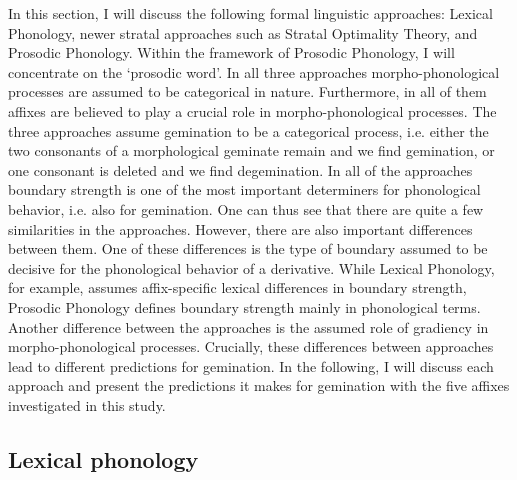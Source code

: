 In this section, I will discuss the following formal linguistic approaches: Lexical Phonology, newer stratal approaches such as Stratal Optimality Theory, and Prosodic Phonology. Within the framework of Prosodic Phonology, I will concentrate on the `prosodic word'.  In all three approaches morpho-phonological processes are assumed to be categorical in nature. Furthermore, in all of them affixes are believed to play a crucial role in morpho-phonological processes. The three approaches assume gemination to be a categorical process, i.e. either the two consonants of a morphological geminate remain and we find gemination, or one consonant is deleted and we find degemination. In all of the approaches boundary strength is one of the most important determiners for phonological behavior, i.e. also for gemination. 
One can thus see that there are quite a few similarities in the approaches. However, there are also important differences between them. One of these differences is the type of boundary assumed to be decisive for the phonological behavior of a derivative. While Lexical Phonology, for example, assumes affix-specific lexical differences in boundary strength, Prosodic Phonology defines boundary strength mainly in phonological terms. 
Another difference between the approaches is the assumed role of gradiency in morpho-phonological processes.
Crucially, these differences between approaches lead to different predictions for gemination. In the following, I will discuss each approach and present the predictions it makes for gemination with the five affixes investigated in this study.


\subsection{Lexical phonology} \label{LexPhon}


